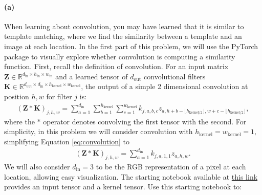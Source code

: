 \documentclass{exam}
\begin{document}
\paragraph{(a)} 
When learning about convolution, you may have learned that it is similar to template matching, where we find the similarity between a template and an image at each location. In the first part of this problem, we will use the PyTorch package to visually explore whether convolution is computing a similarity function. First, recall the definition of convolution. For an input matrix $\mathbf{Z} \in \mathbb{R}^{d_{\text{in}} \times h_{\text{in}} \times w_{\text{in}}}$ and a learned tensor of $d_{\text{out}}$ convolutional filters $\mathbf{K} \in \mathbb{R}^{d_{\text{out}}\times d_{\text{in}} \times h_{\text{kernel}} \times w_{\text{kernel}}}$, the output of a simple 2 dimensional convolution at position $h, w$ for filter $j$ is:
\begin{align}
\label{eq:convolution}
    (\mathbf{Z} * \mathbf{K})_{j, h, w} = \sum_{a=1}^{d_{\text{in}}}
    \sum_{b=1}^{h_{\text{kernel}}}
    \sum_{c=1}^{w_{\text{kernel}}}  k_{j,a,b,c} z_{a, h+b-\lfloor h_{\text{kernel}/2}\rfloor, w+c-\lfloor h_{\text{kernel}/2}\rfloor},
\end{align}
where the $*$ operator denotes convolving the first tensor with the second.
For simplicity, in this problem we will consider convolution with $h_{\text{kernel}} = w_{\text{kernel}} = 1,$ simplifying Equation \ref{eq:convolution} to
\begin{align}
\label{eq:convolution_ez}
    (\mathbf{Z} * \mathbf{K})_{j, h, w} = \sum_{a=1}^{d_{\text{in}}} k_{j,a,1, 1} z_{a, h, w}.
\end{align}
We will also consider $d_{\text{in}} = 3$ to be the RGB representation of a pixel at each location, allowing easy visualization. The starting notebook available at \href{https://colab.research.google.com/drive/1Hg2nFZxd7fE1LIG9DWnsTKINxfdjPaz4?usp=sharing}{this link} provides an input tensor and a kernel tensor. Use this starting notebook to:
\end{document}
